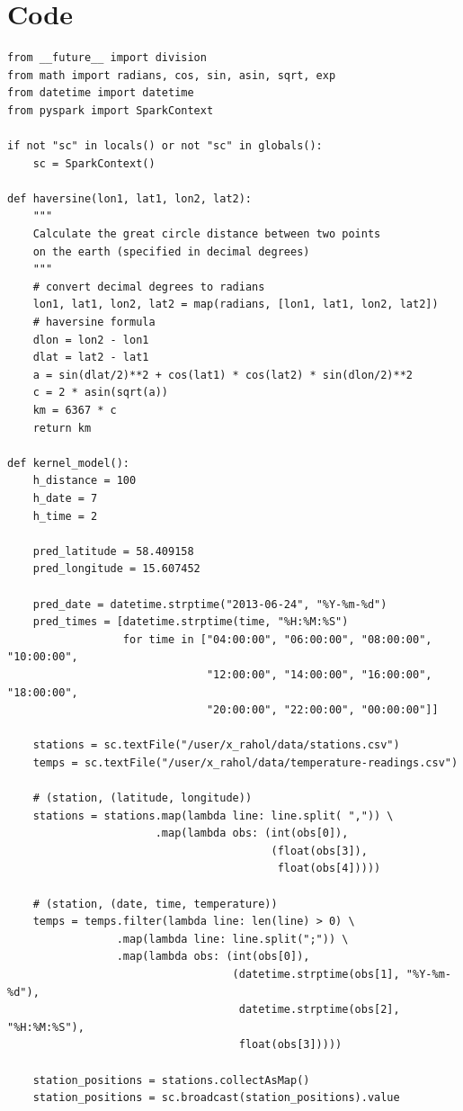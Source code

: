 \documentclass[10pt]{article}
\begin{document}
\section*{Code}
\label{sec-2}
\begin{verbatim}
from __future__ import division
from math import radians, cos, sin, asin, sqrt, exp
from datetime import datetime
from pyspark import SparkContext

if not "sc" in locals() or not "sc" in globals():
    sc = SparkContext()

def haversine(lon1, lat1, lon2, lat2):
    """
    Calculate the great circle distance between two points
    on the earth (specified in decimal degrees)
    """
    # convert decimal degrees to radians
    lon1, lat1, lon2, lat2 = map(radians, [lon1, lat1, lon2, lat2])
    # haversine formula
    dlon = lon2 - lon1
    dlat = lat2 - lat1
    a = sin(dlat/2)**2 + cos(lat1) * cos(lat2) * sin(dlon/2)**2
    c = 2 * asin(sqrt(a))
    km = 6367 * c
    return km

def kernel_model():
    h_distance = 100
    h_date = 7
    h_time = 2

    pred_latitude = 58.409158
    pred_longitude = 15.607452

    pred_date = datetime.strptime("2013-06-24", "%Y-%m-%d")
    pred_times = [datetime.strptime(time, "%H:%M:%S")
                  for time in ["04:00:00", "06:00:00", "08:00:00", "10:00:00",
                               "12:00:00", "14:00:00", "16:00:00", "18:00:00",
                               "20:00:00", "22:00:00", "00:00:00"]]

    stations = sc.textFile("/user/x_rahol/data/stations.csv")
    temps = sc.textFile("/user/x_rahol/data/temperature-readings.csv")

    # (station, (latitude, longitude))
    stations = stations.map(lambda line: line.split( ",")) \
                       .map(lambda obs: (int(obs[0]),
                                         (float(obs[3]),
                                          float(obs[4]))))

    # (station, (date, time, temperature))
    temps = temps.filter(lambda line: len(line) > 0) \
                 .map(lambda line: line.split(";")) \
                 .map(lambda obs: (int(obs[0]),
                                   (datetime.strptime(obs[1], "%Y-%m-%d"),
                                    datetime.strptime(obs[2], "%H:%M:%S"),
                                    float(obs[3]))))

    station_positions = stations.collectAsMap()
    station_positions = sc.broadcast(station_positions).value


\end{verbatim}
\end{document}
